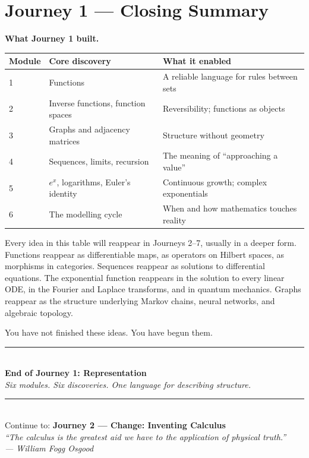 \documentclass[12pt, a4paper]{article}
\begin{document}
\section{Journey 1 \texorpdfstring{---}{--} Closing Summary}

\begin{namebox}
\textbf{What Journey 1 built.}

\medskip
\begin{center}
\renewcommand{\arraystretch}{1.5}
\begin{tabular}{l l l}
\toprule
\textbf{Module} & \textbf{Core discovery} & \textbf{What it enabled} \\
\midrule
1 & Functions & A reliable language for rules between sets \\
2 & Inverse functions, function spaces & Reversibility; functions as objects \\
3 & Graphs and adjacency matrices & Structure without geometry \\
4 & Sequences, limits, recursion & The meaning of ``approaching a value'' \\
5 & $e^x$, logarithms, Euler's identity & Continuous growth; complex exponentials \\
6 & The modelling cycle & When and how mathematics touches reality \\
\bottomrule
\end{tabular}
\end{center}

\medskip
Every idea in this table will reappear in Journeys 2--7, usually in a deeper form. Functions reappear as differentiable maps, as operators on Hilbert spaces, as morphisms in categories. Sequences reappear as solutions to differential equations. The exponential function reappears in the solution to every linear ODE, in the Fourier and Laplace transforms, and in quantum mechanics. Graphs reappear as the structure underlying Markov chains, neural networks, and algebraic topology.

You have not finished these ideas. You have begun them.
\end{namebox}

\vspace{1.4cm}
\begin{center}
{\color{Gold}\rule{0.6\linewidth}{1.2pt}}\\[8pt]
{\large\bfseries\color{NavyBlue} End of Journey 1: Representation}\\[6pt]
{\normalsize\color{DarkGrey}\itshape
Six modules. Six discoveries. One language for describing structure.}\\[10pt]
{\color{Gold}\rule{0.6\linewidth}{1.2pt}}\\[10pt]
{\small\color{DarkGrey}Continue to: \textbf{Journey 2 --- Change: Inventing Calculus}}\\[4pt]
{\small\color{DarkGrey}\itshape
``The calculus is the greatest aid we have to the application of physical truth.''\\
\upshape --- William Fogg Osgood}
\end{center}
\end{document}
